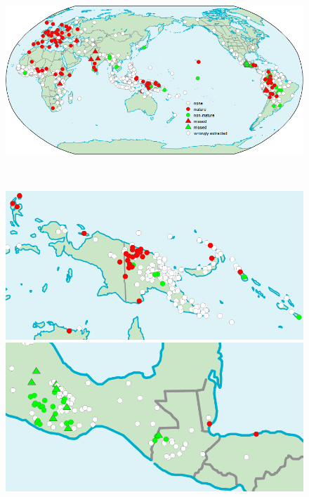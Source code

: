 \documentclass[output=collectionpaper]{langsci/langscibook}
\begin{document}
\begin{figure}
\begin{minipage}[t]{\textwidth}
\includegraphics[width=\textwidth]{figures/12/12-fig1.png}
\end{minipage}\\
\begin{minipage}[t]{0.3\textwidth}
\includegraphics[width=\textwidth]{figures/12/12-fig1a.png}
\end{minipage}
\begin{minipage}[t]{0.3\textwidth}
\includegraphics[width=\textwidth]{figures/12/12-fig1b.png}
\end{minipage}

\end{figure}
\end{document}
